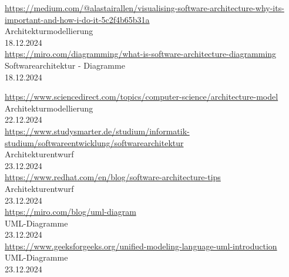 \begin{thebibliography}{999}
    \href{https://medium.com/@alastairallen/visualising-software-architecture-why-its-important-and-how-i-do-it-5c2f4b65b31a}{https://medium.com/@alastairallen/visualising-software-architecture-why-its-important-and-how-i-do-it-5c2f4b65b31a} \\
    Architekturmodellierung \\
    18.12.2024 \\

    \href{https://miro.com/diagramming/what-is-software-architecture-diagramming}{https://miro.com/diagramming/what-is-software-architecture-diagramming} \\
    Softwarearchitektur - Diagramme \\
    18.12.2024 \\

    \clearpage

    \href{https://www.sciencedirect.com/topics/computer-science/architecture-model}{https://www.sciencedirect.com/topics/computer-science/architecture-model} \\
    Architekturmodellierung \\
    22.12.2024 \\

    \href{https://www.studysmarter.de/studium/informatik-studium/softwareentwicklung/softwarearchitektur}{https://www.studysmarter.de/studium/informatik-studium/softwareentwicklung/softwarearchitektur} \\
    Architekturentwurf \\
    23.12.2024 \\

    \href{https://www.redhat.com/en/blog/software-architecture-tips}{https://www.redhat.com/en/blog/software-architecture-tips} \\
    Architekturentwurf \\
    23.12.2024 \\

    \href{https://miro.com/blog/uml-diagram}{https://miro.com/blog/uml-diagram} \\
    UML-Diagramme \\
    23.12.2024 \\

    \href{https://www.geeksforgeeks.org/unified-modeling-language-uml-introduction}{https://www.geeksforgeeks.org/unified-modeling-language-uml-introduction} \\
    UML-Diagramme \\
    23.12.2024 \\


\end{thebibliography}

